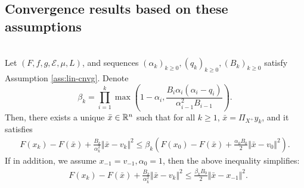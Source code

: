\documentclass[12pt]{article}
\begin{document}
    \subsection{Convergence results based on these assumptions}
            \begin{theorem}\;\label{thm:cnvg-generic-seq}\\
                Let $(F, f, g, \mathcal E, \mu, L)$, and sequences $(\alpha_k)_{k \ge 0}, (q_k)_{k \ge 0}, (B_k)_{k \ge 0}$ 
                satisfy Assumption \ref{ass:lin-cnvg}. 
                Denote 
                $$
                    \beta_k = \prod_{i = 1}^k\max\left(
                        1 - \alpha_i, 
                        \frac{B_i\alpha_i(\alpha_i - q_i)}{\alpha_{i - 1}^2B_{i - 1}}
                    \right). 
                $$
                Then, there exists a unique $\bar x \in \mathbb R^n$ such that for all $k \ge 1$, $\bar x = \Pi_{X^+}y_k$, and it satisfies
                \begin{align*}
                    F(x_k) - F(\bar x) + \frac{B_k}{\alpha_k^2}\Vert \bar x - v_k\Vert^2 
                    \le 
                    \beta_k\left(
                        F(x_0) - F(\bar x) + \frac{\alpha_0B_0}{2}\Vert \bar x - v_0\Vert^2
                    \right). 
                \end{align*}
                If in addition, we assume $x_{-1} = v_{-1}, \alpha_0 = 1$, then the above inequality simplifies: 
                \begin{align*}
                    & F(x_k) - F(\bar x) + \frac{B_k}{\alpha_k^2}\Vert \bar x - v_k\Vert^2 \le 
                    \frac{\beta_kB_0}{2}\Vert \bar x - x_{-1}\Vert^2.
                \end{align*}
            \end{theorem}
\end{document}
